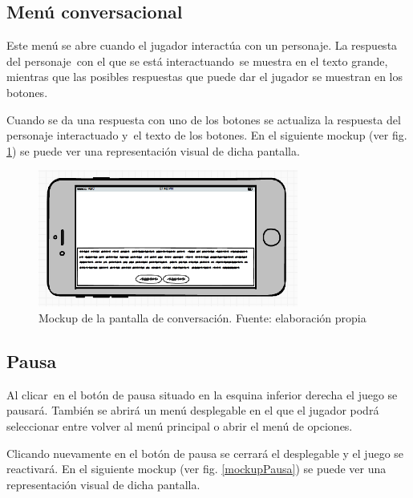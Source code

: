\subsection[Men\'u conversacional]{ Men\'u conversacional}
\hypertarget{Toc484614222}{}{
Este men\'u se abre cuando el jugador interact\'ua con un personaje. La respuesta del personaje\ con el que se est\'a
interactuando\ se muestra en el texto grande, mientras que las posibles respuestas que puede dar el jugador se muestran
en los botones.\ }

{
Cuando se da una respuesta con uno de los botones se actualiza la respuesta del personaje interactuado y\ el texto de
los botones. En el siguiente mockup (ver fig. \ref{mockupConversacion}) se puede ver una representaci\'on visual de dicha pantalla.\ \ }

\begin{figure}
    \begin{center}
 \includegraphics[width=3.36728in,height=1.77154in]{anexos/GDD/GDD-img008.png} 
    \caption{Mockup de la pantalla de conversación. Fuente: elaboración propia}
    \label{mockupConversacion}
    \end{center}

\end{figure}


\subsection[Pausa]{ Pausa}
\hypertarget{Toc484614223}{}{
Al clicar\ en el bot\'on de pausa situado en la esquina inferior derecha el juego se pausar\'a. Tambi\'en se abrir\'a un
men\'u desplegable en el que el jugador podr\'a seleccionar entre volver al men\'u principal o abrir el men\'u de
opciones.}

{
Clicando nuevamente en el bot\'on de pausa se cerrar\'a el desplegable y el juego se reactivar\'a. En el siguiente mockup (ver fig. \ref{mockupPausa}) se puede ver una representaci\'on visual de dicha pantalla.}

